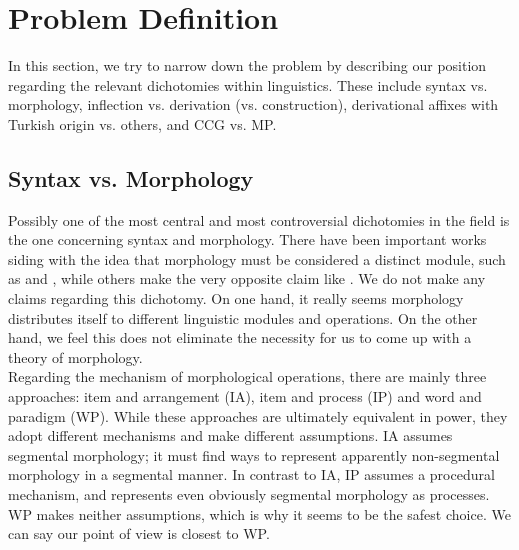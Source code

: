 \documentclass[11pt]{article} %
\begin{document}
\section{Problem Definition}

\label{PrDef}

In this section, we try to narrow down the problem by describing our position regarding the relevant dichotomies within linguistics. These include syntax vs. morphology, inflection vs. derivation (vs. construction), derivational affixes with Turkish origin vs. others, and CCG vs. MP. 

\subsection{Syntax vs. Morphology}

\label{SynMorph}

Possibly one of the most central and most controversial dichotomies in the field is the one concerning syntax and morphology. There have been important works siding with the idea that morphology must be considered a distinct module, such as \citet{Aronoff1994} and \citet{Aronoff2005}, while others make the very opposite claim like \citet{Lieber1992}. We do not make any claims regarding this dichotomy. On one hand, it really seems morphology distributes itself to different linguistic modules and operations. On the other hand, we feel this does not eliminate the necessity for us to come up with a theory of morphology. \\

Regarding the mechanism of morphological operations, there are mainly three approaches: item and arrangement (IA), item and process (IP) and word and paradigm (WP). While these approaches are ultimately equivalent in power, they adopt different mechanisms and make different assumptions. IA assumes segmental morphology; it must find ways to represent apparently non-segmental morphology in a segmental manner. In contrast to IA, IP assumes a procedural mechanism, and represents even obviously segmental morphology as processes. WP makes neither assumptions, which is why it seems to be the safest choice. We can say our point of view is closest to WP.  \\
\end{document}
